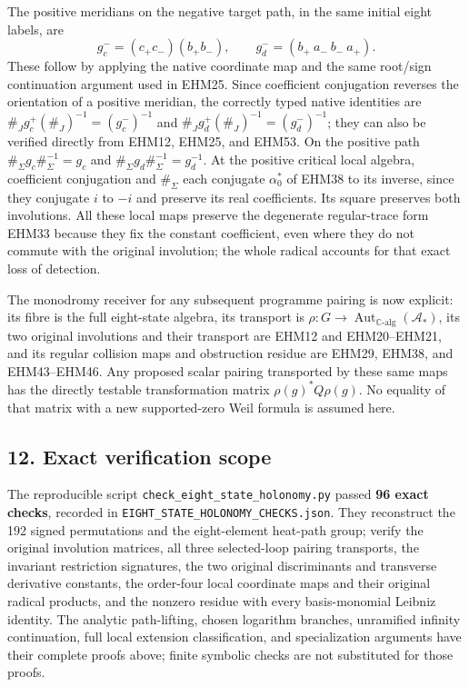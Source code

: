 \documentclass[
  10pt,
  a4paper,
]{article}
\begin{document}
The positive meridians on the negative target path, in the same initial
eight labels, are \[
g_c^-=(c_+c_-)(b_+b_-),\qquad
g_d^-=(b_+\ a_-\ b_-\ a_+).
\tag{EHM53}
\] These follow by applying the native coordinate map and the same
root/sign continuation argument used in EHM25. Since coefficient
conjugation reverses the orientation of a positive meridian, the
correctly typed native identities are
\(\#_Jg_c^+(\#_J)^{-1}=(g_c^-)^{-1}\) and
\(\#_Jg_d^+(\#_J)^{-1}=(g_d^-)^{-1}\); they can also be verified
directly from EHM12, EHM25, and EHM53. On the positive path
\(\#_\Sigma g_c\#_\Sigma^{-1}=g_c\) and
\(\#_\Sigma g_d\#_\Sigma^{-1}=g_d^{-1}\). At the positive critical local
algebra, coefficient conjugation and \(\#_\Sigma\) each conjugate
\(\alpha_0^*\) of EHM38 to its inverse, since they conjugate \(i\) to
\(-i\) and preserve its real coefficients. Its square preserves both
involutions. All these local maps preserve the degenerate regular-trace
form EHM33 because they fix the constant coefficient, even where they do
not commute with the original involution; the whole radical accounts for
that exact loss of detection.

The monodromy receiver for any subsequent programme pairing is now
explicit: its fibre is the full eight-state algebra, its transport is
\(\rho:G\to\operatorname{Aut}_{\mathbb C\text{-alg}}(\mathcal A_*)\),
its two original involutions and their transport are EHM12 and
EHM20--EHM21, and its regular collision maps and obstruction residue are
EHM29, EHM38, and EHM43--EHM46. Any proposed scalar pairing transported
by these same maps has the directly testable transformation matrix
\(\rho(g)^*Q\rho(g)\). No equality of that matrix with a new
supported-zero Weil formula is assumed here.

\subsection{12. Exact verification
scope}\label{exact-verification-scope}

The reproducible script \texttt{check\_\allowbreak{}eight\_\allowbreak{}state\_\allowbreak{}holonomy.\allowbreak{}py} passed
\textbf{96 exact checks}, recorded in
\texttt{EIGHT\_\allowbreak{}STATE\_\allowbreak{}HOLONOMY\_\allowbreak{}CHECKS.\allowbreak{}json}. They reconstruct the 192
signed permutations and the eight-element heat-path group; verify the
original involution matrices, all three selected-loop pairing
transports, the invariant restriction signatures, the two original
discriminants and transverse derivative constants, the order-four local
coordinate maps and their original radical products, and the nonzero
residue with every basis-monomial Leibniz identity. The analytic
path-lifting, chosen logarithm branches, unramified infinity
continuation, full local extension classification, and specialization
arguments have their complete proofs above; finite symbolic checks are
not substituted for those proofs.
\end{document}
